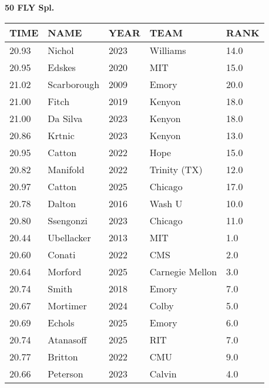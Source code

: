 \begin{center}
\begin{minipage}[t]{0.7\textwidth}
\centering
\textbf{50 FLY Spl.}\\[0.05cm]
\begin{tabular}{@{}p{1.8cm}p{2.8cm}p{1.2cm}p{1.4cm}p{0.8cm}@{}}
\hline
\textbf{TIME} & \textbf{NAME} & \textbf{YEAR} & \textbf{TEAM} & \textbf{RANK} \\
\hline
20.93 & Nichol & 2023 & Williams & 14.0 \\
20.95 & Edskes & 2020 & MIT & 15.0 \\
21.02 & Scarborough & 2009 & Emory & 20.0 \\
21.00 & Fitch & 2019 & Kenyon & 18.0 \\
21.00 & Da Silva & 2023 & Kenyon & 18.0 \\
20.86 & Krtnic & 2023 & Kenyon & 13.0 \\
20.95 & Catton & 2022 & Hope & 15.0 \\
20.82 & Manifold & 2022 & Trinity (TX) & 12.0 \\
20.97 & Catton & 2025 & Chicago & 17.0 \\
20.78 & Dalton & 2016 & Wash U & 10.0 \\
20.80 & Ssengonzi & 2023 & Chicago & 11.0 \\
20.44 & Ubellacker & 2013 & MIT & 1.0 \\
20.60 & Conati & 2022 & CMS & 2.0 \\
20.64 & Morford & 2025 & Carnegie Mellon & 3.0 \\
20.74 & Smith & 2018 & Emory & 7.0 \\
20.67 & Mortimer & 2024 & Colby & 5.0 \\
20.69 & Echols & 2025 & Emory & 6.0 \\
20.74 & Atanasoff & 2025 & RIT & 7.0 \\
20.77 & Britton & 2022 & CMU & 9.0 \\
20.66 & Peterson & 2023 & Calvin & 4.0 \\
\hline
\end{tabular}
\end{minipage}
\end{center}

\vspace{0.4cm}

